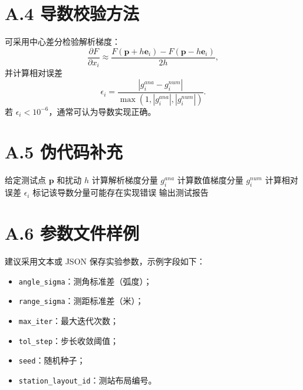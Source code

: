 \section*{A.4 导数校验方法}
可采用中心差分检验解析梯度：
\[
\frac{\partial F}{\partial x_i}\approx
\frac{F(\bm p+h\bm e_i)-F(\bm p-h\bm e_i)}{2h},
\]
并计算相对误差
\[
\epsilon_i=\frac{|g_i^{ana}-g_i^{num}|}{\max(1,|g_i^{ana}|,|g_i^{num}|)}.
\]
若 $\epsilon_i<10^{-6}$，通常可认为导数实现正确。

\section*{A.5 伪代码补充}
\begin{algorithm}[H]
\caption{导数一致性测试}
\begin{algorithmic}[1]
\State 给定测试点 $\bm p$ 和扰动 $h$
\State 计算解析梯度分量 $g_i^{ana}$
\State 计算数值梯度分量 $g_i^{num}$
\State 计算相对误差 $\epsilon_i$
\State 标记该导数分量可能存在实现错误
\EndIf
\EndFor
\State 输出测试报告
\end{algorithmic}
\end{algorithm}

\section*{A.6 参数文件样例}
建议采用文本或 JSON 保存实验参数，示例字段如下：
\begin{itemize}
  \item \texttt{angle\_sigma}：测角标准差（弧度）；
  \item \texttt{range\_sigma}：测距标准差（米）；
  \item \texttt{max\_iter}：最大迭代次数；
  \item \texttt{tol\_step}：步长收敛阈值；
  \item \texttt{seed}：随机种子；
  \item \texttt{station\_layout\_id}：测站布局编号。
\end{itemize}
